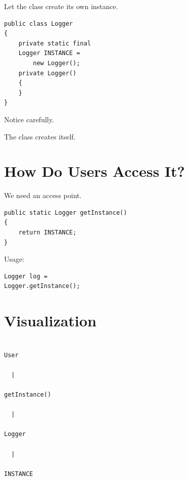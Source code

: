 \documentclass[11pt,a4paper]{book}
\begin{document}
Let the class create
its own instance.


\begin{verbatim}
public class Logger
{
    private static final
    Logger INSTANCE =
        new Logger();
    private Logger()
    {
    }
}
\end{verbatim}


Notice carefully.


The class creates itself.


\section{How Do Users Access It?}

We need an access point.


\begin{verbatim}
public static Logger getInstance()
{
    return INSTANCE;
}
\end{verbatim}


Usage:

\begin{verbatim}
Logger log =
Logger.getInstance();
\end{verbatim}


\section{Visualization}

\begin{verbatim}

User

  |

getInstance()

  |

Logger

  |

INSTANCE

\end{verbatim}
\end{document}
